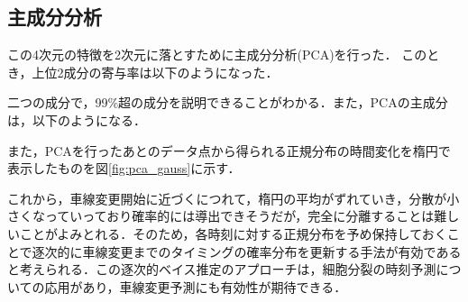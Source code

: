 \subsection{主成分分析}
この4次元の特徴を2次元に落とすために主成分分析(PCA)を行った．
このとき，上位2成分の寄与率は以下のようになった．

二つの成分で，99\%超の成分を説明できることがわかる．また，PCAの主成分は，以下のようになる．

また，PCAを行ったあとのデータ点から得られる正規分布の時間変化を楕円で表示したものを図\ref{fig:pca_gauss}に示す．

これから，車線変更開始に近づくにつれて，楕円の平均がずれていき，分散が小さくなっていっており確率的には導出できそうだが，完全に分離することは難しいことがよみとれる．そのため，各時刻に対する正規分布を予め保持しておくことで逐次的に車線変更までのタイミングの確率分布を更新する手法が有効であると考えられる．この逐次的ベイス推定のアプローチは，細胞分裂の時刻予測についての応用\cite{Kozawa}があり，車線変更予測にも有効性が期待できる．
